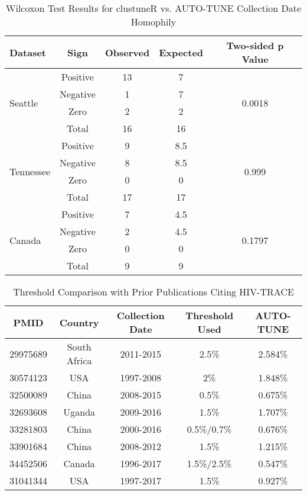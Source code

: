 \documentclass[utf8]{FrontiersinHarvard} %
\begin{document}
\begin{table}[h]
\centering
\caption{Wilcoxon Test Results for clustuneR vs. AUTO-TUNE Collection Date Homophily}
\label{table:wilcoxon-test}
\begin{tabular}{lcccc}
\hline
\textbf{Dataset} & \textbf{Sign} & \textbf{Observed} & \textbf{Expected} & \textbf{Two-sided p Value} \\
\hline
\multirow{4}{*}{Seattle} & Positive & 13 & 7 & \multirow{4}{*}{0.0018} \\
 & Negative & 1 & 7 &  \\
 & Zero & 2 & 2 & \\
 & Total & 16 & 16 & \\
\hline
\multirow{4}{*}{Tennessee} & Positive & 9 & 8.5 & \multirow{4}{*}{0.999} \\
 & Negative & 8 & 8.5 & \\
 & Zero & 0 & 0 & \\
 & Total & 17 & 17 & \\
\hline
\multirow{4}{*}{Canada} & Positive & 7 & 4.5 & \multirow{4}{*}{0.1797} \\
 & Negative & 2 & 4.5 & \\
 & Zero & 0 & 0 & \\
 & Total & 9 & 9 & \\
\hline
\end{tabular}
\end{table}

\begin{table}[h]
	\caption{Threshold Comparison with Prior Publications Citing HIV-TRACE}
	\vspace{10pt}
	\centering
	\label{tab:paperComparison}
	\begin{tabular}{|c|c|c|c|c|}
		\hline
		PMID     & Country      & Collection Date & Threshold Used & AUTO-TUNE \\
		\hline
		29975689 & South Africa & 2011-2015       & 2.5\%          & 2.584\%   \\
		30574123 & USA          & 1997-2008       & 2\%            & 1.848\%   \\
		32500089 & China        & 2008-2015       & 0.5\%          & 0.675\%   \\
		32693608 & Uganda       & 2009-2016       & 1.5\%          & 1.707\%   \\
		33281803 & China        & 2000-2016       & 0.5\%/0.7\%    & 0.676\%   \\
		33901684 & China        & 2008-2012       & 1.5\%          & 1.215\%   \\
		34452506 & Canada       & 1996-2017       & 1.5\%/2.5\%    & 0.547\%   \\
		31041344 & USA          & 1997-2017       & 1.5\%          & 0.927\%   \\
		\hline
	\end{tabular}
\end{table}
\end{document}
